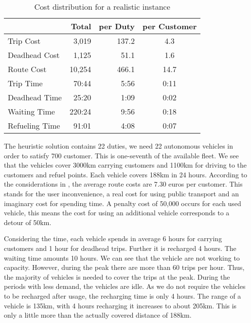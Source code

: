 \begin{table}[htb]
	\centering
	\begin{tabular}{l|rrc}
		\toprule
		& Total & per Duty & per Customer \\
		\midrule
		Trip Cost     &  3,019 & 137.2 &  4.3 \\
		Deadhead Cost &  1,125 &  51.1 &  1.6 \\
		Route Cost    & 10,254 & 466.1 & 14.7 \\
		\midrule
		Trip Time      &  70:44 & 5:56 & 0:11 \\
		Deadhead Time  &  25:20 & 1:09 & 0:02 \\
		Waiting Time   & 220:24 & 9:56 & 0:18 \\
		Refueling Time &  91:01 & 4:08 & 0:07 \\
		\bottomrule
	\end{tabular}
	\caption{Cost distribution for a realistic instance}
	\label{tab:results:realistic}
\end{table}

The heuristic solution contains 22 duties, \ie we need 22 autonomous vehicles in order to satisfy 700 customer. This is one-seventh of the available fleet. We see that the vehicles cover 3000km carrying customers and 1100km for driving to the customers and refuel points. Each vehicle covers 188km in 24 hours. According to the considerations in , the average route costs are 7.30 euros per customer. This stands for the user inconvenience, \ie a real cost for using public transport and an imaginary cost for spending time. A penalty cost of 50,000 occurs for each used vehicle, this means the cost for using an additional vehicle corresponds to a detour of 50km.

Considering the time, each vehicle spends in average 6 hours for carrying customers and 1 hour for deadhead trips. Further it is recharged 4 hours. The waiting time amounts 10 hours. We can see that the vehicle are not working to capacity. However, during the peak there are more than 60 trips per hour. Thus, the majority of vehicles is needed to cover the trips at the peak. During the periods with less demand, the vehicles are idle. As we do not require the vehicles to be recharged after usage, the recharging time is only 4 hours. The range of a vehicle is 135km, with 4 hours recharging it increases to about 205km. This is only a little more than the actually covered distance of 188km.

